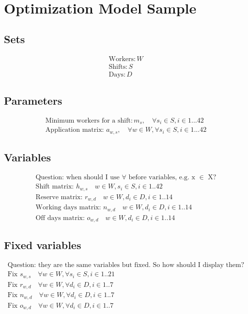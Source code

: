 \documentclass{article}
\begin{document}
\section*{Optimization Model Sample}

\subsection*{Sets}
\begin{align*}
\text{Workers}: W \\
\text{Shifts}: S \\
\text{Days}: D
\end{align*}

\subsection*{Parameters}
\begin{align*}
\text{Minimum workers for a shift}: m_{s}, \quad \forall  s_i \in S, i \in {1...42} \\
\text{Application matrix: } a_{w, s}, \quad \forall w \in W, \forall  s_i \in S, i \in {1...42} 
\end{align*}

\subsection*{Variables}
\begin{align*}
\text{Question: when should I use $\forall$ before variables, e.g. x $\in$ X?} \\
\text{Shift matrix: } h_{w, s} \quad w \in W, s_i \in S, i \in {1..42}\\
\text{Reserve matrix: } r_{w, d} \quad w \in W, d_i \in D, i \in {1..14} \\
\text{Working days matrix: } n_{w, d} \quad w \in W, d_i \in D, i \in {1..14} \\
\text{Off days matrix: } o_{w, d} \quad w \in W, d_i \in D, i \in {1..14} 
\end{align*}

\subsection*{Fixed variables}
\begin{align*}
\text{Question: they are the same variables but fixed. So how should I display them?} \\
\text{Fix } s_{w, s}  \quad \forall w \in W, \forall s_i \in S, i \in {1..21} \\
\text{Fix } r_{w, d}  \quad \forall w \in W, \forall d_i \in D, i \in {1..7} \\
\text{Fix } n_{w, d}  \quad \forall w \in W, \forall d_i \in D, i \in {1..7} \\
\text{Fix } o_{w, d}  \quad \forall w \in W, \forall d_i \in D, i \in {1..7}
\end{align*}
\end{document}
